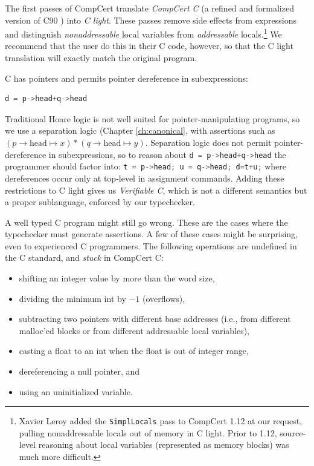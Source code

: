 \documentclass{puthesis}
\begin{document}
The first passes of CompCert translate
\emph{CompCert C} (a refined and formalized version of C90
\cite{leroy13:compcert}) into \emph{C light}.
These passes remove side effects from expressions
and distinguish \emph{nonaddressable} local variables from
\emph{addressable} locals.\footnote{Xavier Leroy
added the \lstinline|SimplLocals| pass to CompCert 1.12 at our request,
pulling nonaddressable locals out of memory in C light.
Prior to 1.12, source-level reasoning about local
variables (represented as memory blocks) was  much more difficult.} We recommend
that the user do this in their C code, however, so that the C light translation
will exactly match the original program.

C has pointers and permits pointer dereference in subexpressions: 
\begin{lstlisting}[language=C]
d = p->head+q->head
\end{lstlisting}

Traditional Hoare logic is not well suited for pointer-manipulating programs,
so we use a separation logic (Chapter \ref{ch:canonical}, with assertions such as 
$(p\!\!\rightarrow \! \! \mathrm{head} \mapsto x) *(q \!\! \rightarrow \! \!
\mathrm{head} \mapsto y)$. Separation logic does not permit pointer-dereference
in subexpressions, so to reason about 
\lstinline[language=C]|d = p->head+q->head| 
the programmer should factor into:
\lstinline[language=c]|t = p->head; u = q->head; d=t+u;|
where dereferences occur only at top-level in assignment commands.
Adding these restrictions to C light gives us \emph{Verifiable C}, which is not
a different semantics but a proper sublanguage, enforced by our typechecker.

A well typed C program might still go wrong. These are the cases where the
typechecker must generate assertions. A few of these cases might be surprising,
even to experienced C programmers.
The following operations are undefined in the C standard,
and \emph{stuck} in CompCert C:
\begin {itemize}
  \item shifting an integer value by more than the word size,
  \item dividing the minimum int by $-1$  (overflows),
  \item subtracting two pointers with different base addresses (i.e.,
from different malloc'ed blocks or from different addressable local
variables),
  \item casting a float to an int when the float is out of integer range,
  \item dereferencing a null pointer, and
  \item using an uninitialized variable.
\end{itemize}
\end{document}
